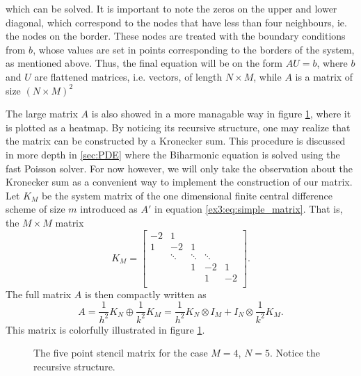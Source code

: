 which can be solved.
It is important to note the zeros on the upper and lower diagonal, which correspond to the nodes that have less than four neighbours, ie. the nodes on the border.
These nodes are treated with the boundary conditions from $b$, whose values are set in points corresponding to the borders of the system, as mentioned above.
Thus, the final equation will be on the form $AU = b$, where $b$ and $U$ are flattened matrices, i.e. vectors, of length $N \times M$, while $A$ is a matrix of size $(N \times M)^2$

The large matrix $A$ is also showed in a more managable way in figure \ref{fig:laplace:stencil}, where it is plotted as a heatmap.
By noticing its recursive structure, one may realize that the matrix can be constructed by a Kronecker sum.
This procedure is discussed in more depth in \ref{sec:PDE} where the Biharmonic equation is solved using the fast Poisson solver.
For now however, we will only take the observation about the Kronecker sum as a convenient way to implement the construction of our matrix.
Let $K_M$ be the system matrix of the one dimensional finite central difference scheme of size $m$ introduced as $A'$ in equation \eqref{ex3:eq:simple_matrix}.
That is, the $M\times M$ matrix
$$
K_M =
\begin{bmatrix}
  -2& 1 \\
  1 & -2 & 1 &   \\
  & \ddots & \ddots & \ddots & \\
  &   & 1 & -2 & 1 \\
  &   &  & 1 & -2 \\
\end{bmatrix}.
$$
The full matrix $A$ is then compactly written as
\begin{equation}
  A =
  \frac{1}{h^2} K_N \oplus \frac{1}{k^2} K_M
  = \frac{1}{h^2} K_N \otimes I_M
  + I_N \otimes \frac{1}{k^2} K_M.
\end{equation}
This matrix is colorfully illustrated in figure \ref{fig:laplace:stencil}.

\begin{figure}[btp]
  \centering

  \caption{The five point stencil matrix for the case $M=4$, $N=5$. Notice the recursive structure.}
  \label{fig:laplace:stencil}
\end{figure}

